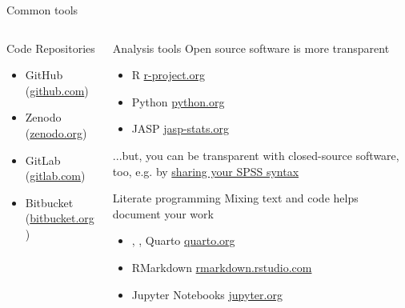 \begin{block}{Common tools}
\begin{columns}[t]
\begin{column}{.45\linewidth}
      \begin{subblock}{\hfill Code Repositories\hfill {}}
      \begin{itemize}
        \item {} GitHub (\href{https://www.github.com}{github.com})
        \item Zenodo (\href{https://www.zenodo.org}{zenodo.org})
        \item {} GitLab (\href{https://www.gitlab.com}{gitlab.com})
        \item {} Bitbucket (\href{https://www.bitbucket.org}{bitbucket.org})
      \end{itemize}
    \end{subblock}

  \end{column}\hfill
   
  \begin{column}{.45\linewidth}

    \begin{subblock}{ \hfill Analysis tools\hfill {}}
      Open source software is more transparent \\ 
      \vspace{0.5em}
      \begin{itemize}
        \item {} R \href{https://www.r-project.org/}{r-project.org}
        \item {} Python \href{https://www.python.org/}{python.org}
        \item JASP \href{https://jasp-stats.org/}{jasp-stats.org}
      \end{itemize}

      ...but, you can be transparent with closed-source software, too, e.g. by \href{https://www.spss-tutorials.com/spss-syntax/}{sharing your SPSS syntax}
    \end{subblock}
   
    \begin{subblock}{\hfill Literate programming\hfill {}}
      Mixing text and code helps document your work \\ 
      \begin{itemize}
        \item {}, ,   Quarto \href{https://quarto.org/}{quarto.org}
        \item {} RMarkdown \href{https://rmarkdown.rstudio.com/}{rmarkdown.rstudio.com}
        \item {} Jupyter Notebooks \href{https://jupyter.org/}{jupyter.org}
      \end{itemize}  
    \end{subblock}
    

\end{column}
\end{columns}
\end{block}
